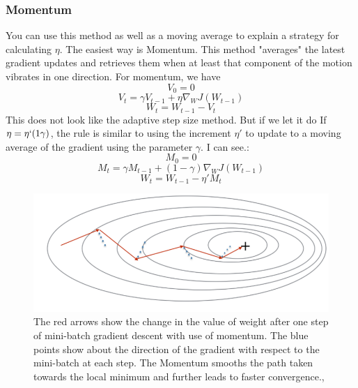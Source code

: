 \subsubsection{Momentum}
You can use this method as well as a moving average to explain a strategy for calculating $\eta$. The easiest way is Momentum. This method "averages" the latest gradient updates and retrieves them when at least  that component of the motion vibrates in one direction. For momentum, we have\\
\begin{equation*}
      V_0 = 0
\end{equation*}
\begin{equation*}
         V_t = \gamma V_{t-1} + \eta \nabla_W J (W_{t-1})
\end{equation*}
\begin{equation*}
         W_t =  W_{t-1} - V_t
\end{equation*}
This does not look like the adaptive step size method. But if we let it do 
 If $\eta = \eta`(1 \gamma)$, the rule is similar to using the increment $\eta'$ to update to a moving average of the gradient using the parameter $\gamma$. I can see.:
\begin{equation*}
    M_0 = 0
\end{equation*}
\begin{equation*}
           M_t = \gamma M_{t-1} + (1-\gamma) \nabla_W J (W_{t-1})
\end{equation*}
\begin{equation*}
         W_t =  W_{t-1} - \eta'M_t
\end{equation*}

\begin{figure}[H]
    \centering
    \includegraphics[scale=0.3]{Figure/ml__11.png}
    \caption{The red arrows show the change in the value of weight after one step of mini-batch gradient descent with use of momentum. The blue points show about the direction of the gradient with respect to
the mini-batch at each step. The Momentum smooths the path taken towards the local
minimum and further leads to faster convergence.\cite{21},\cite{25}}
    \label{fig:my_label}
\end{figure}

